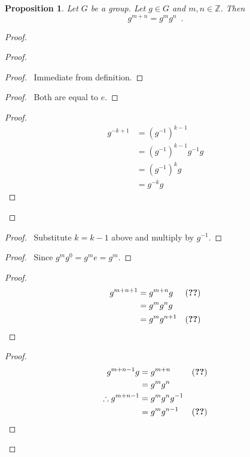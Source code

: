 \documentclass{book}
\let\qed\relax
\newtheorem{prop}{Proposition}[chapter]
\theoremstyle{definition}
\begin{document}
\begin{prop}
    \label{prop:power-add}
    Let $G$ be a group. Let $g \in G$ and $m,n \in \mathbb{Z}$. Then
    \[ g^{m+n} = g^m g^n \enspace . \]
\end{prop}

\begin{proof}
    \pf
    \begin{proof}
        \begin{proof}
            \pf\ Immediate from definition.
        \end{proof}
        \begin{proof}
            \pf\ Both are equal to $e$.
        \end{proof}
        \begin{proof}
            \pf
            \begin{align*}
                g^{-k+1} & = (g^{-1})^{k-1} \\
                & = (g^{-1})^{k-1} g^{-1} g \\
                & = (g^{-1})^k g \\
                & = g^{-k} g
            \end{align*}
        \end{proof}
    \end{proof}
    \begin{proof}
        \pf\ Substitute $k = k-1$ above and multiply by $g^{-1}$.
    \end{proof}
    \begin{proof}
        \pf\ Since $g^m g^0 = g^m e = g^m$.
    \end{proof}
    \begin{proof}
        \pf
        \begin{align*}
            g^{m+n+1} & = g^{m+n} g & (\text{\stepref{1}}) \\
            & = g^m g^n g \\
            & = g^m g^{n+1} & (\text{\stepref{1}})
        \end{align*}
    \end{proof}
    \begin{proof}
        \pf
        \begin{align*}
            g^{m+n-1} g & = g^{m+n} & (\text{\stepref{1}})\\
            & = g^m g^n \\
            \therefore g^{m+n-1} & = g^m g^n g^{-1} \\
            & = g^m g^{n-1} & (\text{\stepref{2}})
        \end{align*}
    \end{proof}
    \qed
\end{proof}
\end{document}
